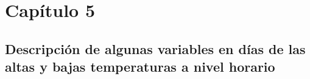 \chapter{Capítulo 5}
\section{Descripción de algunas variables en días de las altas y bajas temperaturas a nivel horario}


%
%

